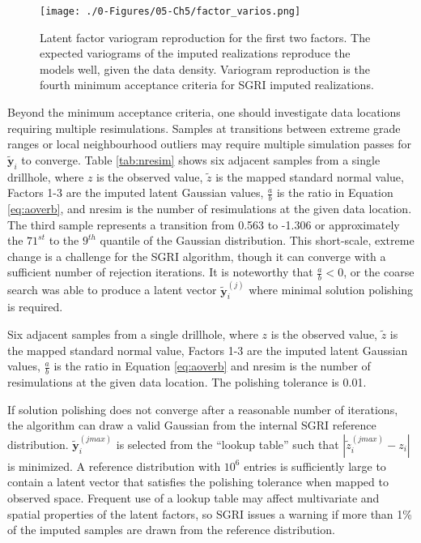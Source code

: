 \begin{figure}[htb!]
    \centering
    \texttt{[image: ./0-Figures/05-Ch5/factor\_varios.png]}
    \caption{Latent factor variogram reproduction for the first two factors. The expected variograms of the imputed realizations reproduce the models well, given the data density. Variogram reproduction is the fourth minimum acceptance criteria for \gls{SGRI} imputed realizations.}
    \label{fig:factor_varios}
\end{figure}

Beyond the minimum acceptance criteria, one should investigate data locations requiring multiple resimulations. Samples at transitions between extreme grade ranges or local neighbourhood outliers may require multiple simulation passes for $\tilde{\mathbf{y}}_{i}$ to converge. Table \ref{tab:nresim} shows six adjacent samples from a single drillhole, where $z$ is the observed value, $\tilde{z}$ is the mapped standard normal value, Factors 1-3 are the imputed latent Gaussian values, $\frac{a}{b}$ is the ratio in Equation \ref{eq:aoverb}, and nresim is the number of resimulations at the given data location. The third sample represents a transition from 0.563 to -1.306 or approximately the $71^{st}$ to the $9^{th}$ quantile of the Gaussian distribution. This short-scale, extreme change is a challenge for the \gls{SGRI} algorithm, though it can converge with a sufficient number of rejection iterations. It is noteworthy that $\frac{a}{b} < 0$, or the coarse search was able to produce a latent vector $\tilde{\mathbf{y}}_{i}^{(j)}$ where minimal solution polishing is required.

\begin{table}[!htb]
    \centering
    \caption{Six adjacent samples from a single drillhole, where $z$ is the observed value, $\tilde{z}$ is the mapped standard normal value, Factors 1-3 are the imputed latent Gaussian values, $\frac{a}{b}$ is the ratio in Equation \ref{eq:aoverb} and nresim is the number of resimulations at the given data location. The polishing tolerance is 0.01. }
    \resizebox{0.9\width}{!}{}
    \label{tab:nresim}
\end{table}

If solution polishing does not converge after a reasonable number of iterations, the algorithm can draw a valid Gaussian from the internal \gls{SGRI} reference distribution. $\tilde{\mathbf{y}}_{i}^{(jmax)}$ is selected from the ``lookup table'' such that $|\tilde{z}_{i}^{(jmax)} - z_{i}|$ is minimized. A reference distribution with $10^{6}$ entries is sufficiently large to contain a latent vector that satisfies the polishing tolerance when mapped to observed space. Frequent use of a lookup table may affect multivariate and spatial properties of the latent factors, so \gls{SGRI} issues a warning if more than 1\% of the imputed samples are drawn from the reference distribution.

